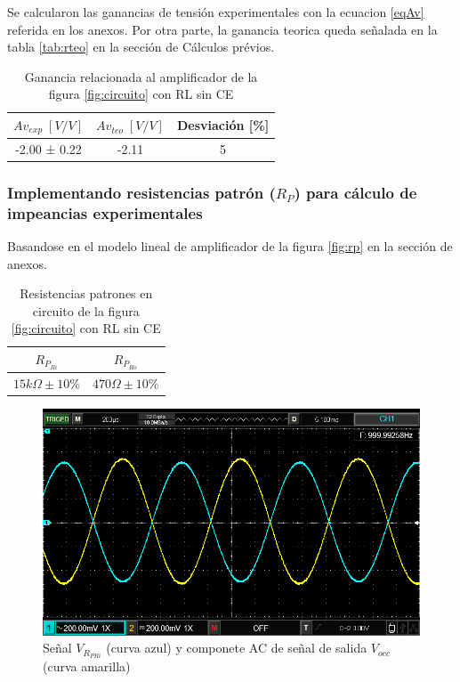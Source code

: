 \documentclass[12pt, a4paper]{article}
\begin{document}
    Se calcularon las ganancias de tensión experimentales con la ecuacion \eqref{eqAv} referida en los anexos. Por otra parte, la ganancia teorica queda señalada en la tabla \ref{tab:rteo} en la sección de Cálculos prévios.

    \begin{table}[h!]
        \centering
        \caption{Ganancia relacionada al amplificador de la figura \ref{fig:circuito} con RL sin CE}
        \label{tab:av2}
        \begin{tabular}{|c|c|c|} \hline
            $Av_{exp} \; [V/V]$  &  $Av_{teo} \; [V/V]$  & Desviación [\%] \\ \hline
            -2.00 ± 0.22         &       -2.11              & 5   \\ \hline
        \end{tabular}
    \end{table}

    \subsubsection{Implementando resistencias patrón ($R_P$) para cálculo de impeancias experimentales}

    Basandose en el modelo lineal de amplificador de la figura \ref{fig:rp} en la sección de anexos.

    \begin{table}[h!]
        \centering
        \caption{Resistencias patrones en circuito de la figura \ref{fig:circuito} con RL sin CE}
        \label{tab:rp2}
        \begin{tabular}{|c|c|} \hline
            $R_{P_{Ri}}$          &  $R_{P_{Ro}}$  \\ \hline
            $15k\Omega \pm 10\%$  &  $470\Omega \pm 10\%$    \\ \hline
        \end{tabular}
    \end{table}

    \newpage

    \begin{figure}[h!]
        \centering
        \includegraphics[height=5cm\textwidth]{RPcRLsCE.png}
        \caption{Señal $V_{R_{PRi}}$ (curva azul) y componete AC de señal de salida $V_{occ}$ (curva amarilla)}
        \label{fig:vrp2}
    \end{figure}
\end{document}
